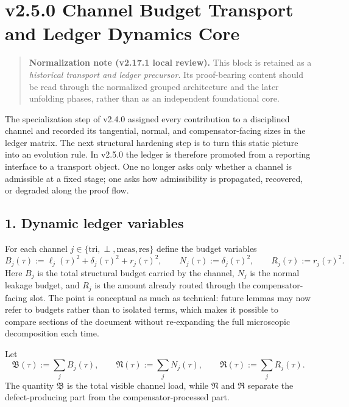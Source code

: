 \section*{v2.5.0 Channel Budget Transport and Ledger Dynamics Core}

\begin{quote}
\textbf{Normalization note (v2.17.1 local review).}
This block is retained as a \emph{historical transport and ledger precursor}. Its proof-bearing content should be read through the normalized grouped architecture and the later unfolding phases, rather than as an independent foundational core.
\end{quote}

The specialization step of v2.4.0 assigned every contribution to a disciplined
channel and recorded its tangential, normal, and compensator-facing sizes in the
ledger matrix. The next structural hardening step is to turn this static picture
into an evolution rule. In v2.5.0 the ledger is therefore promoted from a
reporting interface to a transport object. One no longer asks only whether a
channel is admissible at a fixed stage; one asks how admissibility is propagated,
recovered, or degraded along the proof flow.

\subsection*{1. Dynamic ledger variables}
For each channel $j\in\{\mathrm{tri},\perp,\mathrm{meas},\mathrm{res}\}$ define the
budget variables
\[
B_j(\tau):=\ell_j(\tau)^2+\delta_j(\tau)^2+r_j(\tau)^2,
\qquad
N_j(\tau):=\delta_j(\tau)^2,
\qquad
R_j(\tau):=r_j(\tau)^2.
\]
Here $B_j$ is the total structural budget carried by the channel, $N_j$ is the
normal leakage budget, and $R_j$ is the amount already routed through the
compensator-facing slot. The point is conceptual as much as technical: future
lemmas may now refer to budgets rather than to isolated terms, which makes it
possible to compare sections of the document without re-expanding the full
microscopic decomposition each time.

Let
\[
\mathfrak B(\tau):=\sum_j B_j(\tau),
\qquad
\mathfrak N(\tau):=\sum_j N_j(\tau),
\qquad
\mathfrak R(\tau):=\sum_j R_j(\tau).
\]
The quantity $\mathfrak B$ is the total visible channel load, while
$\mathfrak N$ and $\mathfrak R$ separate the defect-producing part from the
compensator-processed part.

